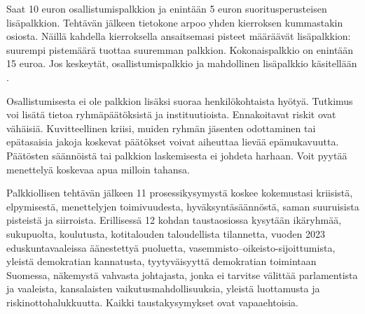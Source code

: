 Saat 10 euron osallistumispalkkion ja enintään 5 euron suoritusperusteisen lisäpalkkion. Tehtävän jälkeen tietokone arpoo yhden kierroksen kummastakin osiosta. Näillä kahdella kierroksella ansaitsemasi pisteet määräävät lisäpalkkion: suurempi pistemäärä tuottaa suuremman palkkion.  Kokonaispalkkio on enintään 15 euroa. Jos keskeytät, osallistumispalkkio ja mahdollinen lisäpalkkio käsitellään . 

Osallistumisesta ei ole palkkion lisäksi suoraa henkilökohtaista hyötyä. Tutkimus voi lisätä tietoa ryhmäpäätöksistä ja instituutioista. Ennakoitavat riskit ovat vähäisiä. Kuvitteellinen kriisi, muiden ryhmän jäsenten odottaminen tai epätasaisia jakoja koskevat päätökset voivat aiheuttaa lievää epämukavuutta. Päätösten säännöistä tai palkkion laskemisesta ei johdeta harhaan. Voit pyytää  menettelyä koskevaa apua milloin tahansa.

Palkkiollisen tehtävän jälkeen 11 prosessikysymystä koskee kokemustasi kriisistä, elpymisestä, menettelyjen toimivuudesta, hyväksyntäsäännöstä, saman suuruisista pisteistä ja siirroista. Erillisessä 12 kohdan taustaosiossa kysytään ikäryhmää, sukupuolta, koulutusta, kotitalouden taloudellista tilannetta, vuoden 2023 eduskuntavaaleissa äänestettyä puoluetta, vasemmisto--oikeisto-sijoittumista, yleistä demokratian kannatusta, tyytyväisyyttä demokratian toimintaan Suomessa, näkemystä vahvasta johtajasta, jonka ei tarvitse välittää parlamentista ja vaaleista, kansalaisten vaikutusmahdollisuuksia, yleistä luottamusta ja riskinottohalukkuutta. Kaikki taustakysymykset ovat vapaaehtoisia. 

